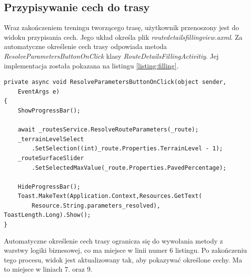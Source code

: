 \subsection{Przypisywanie cech do trasy}
Wraz zakończeniem treningu tworzącego trasę, użytkownik przenoszony jest do widoku przypisania cech. Jego układ określa plik \textit{route\textunderscore details\textunderscore filling\textunderscore view.axml}. Za automatyczne określenie cech trasy odpowiada metoda \textit{ResolveParametersButtonOnClick} klasy \textit{RouteDetailsFillingActivitiy}. Jej implementacja została pokazana na listingu \ref{listing:filling}.
\begin{lstlisting}[caption={Wywołanie procesu automatycznego przypisania cech trasy},label=listing:filling]
private async void ResolveParametersButtonOnClick(object sender,
	EventArgs e)
{
    ShowProgressBar();

    await _routesService.ResolveRouteParameters(_route);
    _terrainLevelSelect
    	.SetSelection((int)_route.Properties.TerrainLevel - 1);
    _routeSurfaceSlider
    	.SetSelectedMaxValue(_route.Properties.PavedPercentage);

    HideProgressBar();
    Toast.MakeText(Application.Context,Resources.GetText(
    	Resource.String.parameters_resolved), ToastLength.Long).Show();
}
\end{lstlisting}
Automatyczne określenie cech trasy ogranicza się do wywołania metody z warstwy logiki biznesowej, co ma miejsce w linii numer 6 listingu. Po zakończeniu tego procesu, widok jest aktualizowany tak, aby pokazywać określone cechy. Ma to miejsce w liniach 7. oraz 9.
